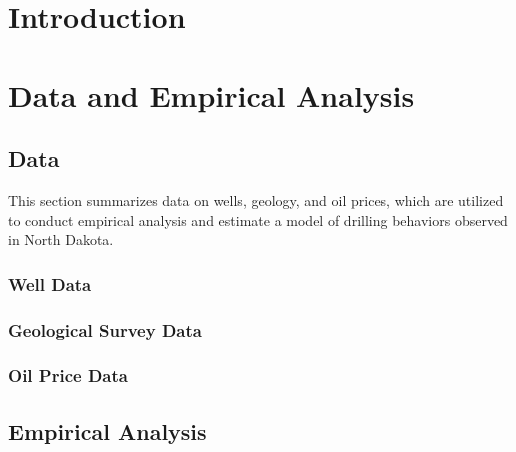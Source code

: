\section{Introduction}
\label{C3-Section:Introduction}




\section{Data and Empirical Analysis}
\label{C3-Section:Data-and-Empirical-Analysis}

\subsection{Data}
\label{C3-SubSection:Data}
This section summarizes data on wells, geology, and oil prices, which are utilized to conduct empirical analysis and estimate a model of drilling behaviors observed in North Dakota. 

\subsubsection{Well Data}
\label{C3-SubSubSection:Well-Data}


\subsubsection{Geological Survey Data}
\label{C3-SubSubSection:Geological-Survey-Data}


\subsubsection{Oil Price Data}
\label{C3_SubSubSection:Oil-Price-Data}



\subsection{Empirical Analysis}
\label{C3-SubSection:Empirical-Analysis}

